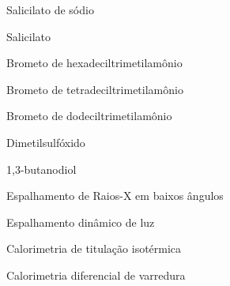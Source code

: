 \documentclass[
	12pt,				%
	openright,			%
	twoside,			%
	a4paper,			%
	english,			%
	brazil%
	]{abntex2}
\newcommand{\Sal}{Sal\textsuperscript{--}}
\newcommand{\CTAB}{C\textsubscript{16}TAB}
\newcommand{\TTAB}{C\textsubscript{14}TAB}
\newcommand{\DTAB}{C\textsubscript{12}TAB}
\newcommand{\BD}{1,3-BD}  %
\begin{document}

\listoffigures*
\cleardoublepage

\listoftables*
\listoflistings
\cleardoublepage

\begin{siglas}
  \item[NaSal] Salicilato de sódio
  \item[\Sal] Salicilato
  \item[\CTAB] Brometo de hexadeciltrimetilamônio
  \item[\TTAB] Brometo de tetradeciltrimetilamônio
  \item[\DTAB] Brometo de dodeciltrimetilamônio
  \item[DMSO] Dimetilsulfóxido
  \item[\BD] 1,3-butanodiol
  \item[SAXS] Espalhamento de Raios-X em baixos ângulos
  \item[DLS] Espalhamento dinâmico de luz
  \item[ITC] Calorimetria de titulação isotérmica
  \item[DSC] Calorimetria diferencial de varredura
\end{siglas}


\tableofcontents*
\cleardoublepage


\textual

\end{document}
